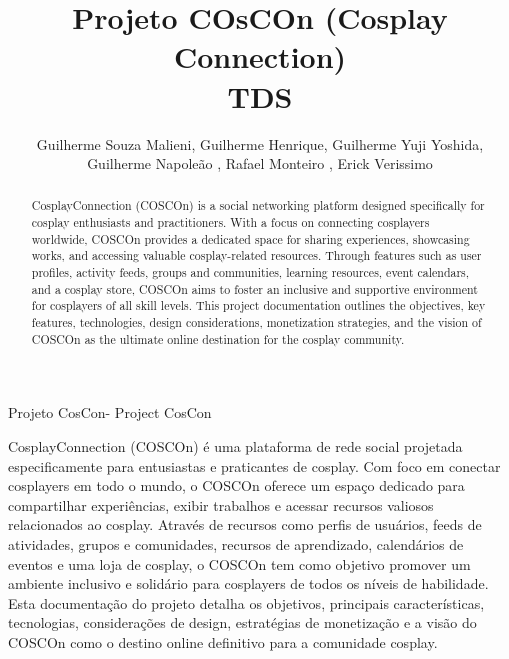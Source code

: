 \documentclass[12pt,a4paper,chapter=TITLE,section=TITLE,subsection=TITLE,subsubsection=TITLE]{article}
\title{Projeto COsCOn (Cosplay Connection)\\TDS}
\author{Guilherme Souza Malieni\inst{1}, Guilherme Henrique\inst{2}, Guilherme Yuji Yoshida\inst{3},\\ Guilherme Napoleão \inst{4} , Rafael Monteiro\inst{5} , Erick Verissimo\inst{6} }
\begin{document}
  



\frenchspacing 


%
%

\maketitle
Projeto CosCon-
Project CosCon

\begin{abstract}
  CosplayConnection (COSCOn) is a social networking platform designed specifically for cosplay enthusiasts and practitioners. With a focus on connecting cosplayers worldwide, COSCOn provides a dedicated space for sharing experiences, showcasing works, and accessing valuable cosplay-related resources. Through features such as user profiles, activity feeds, groups and communities, learning resources, event calendars, and a cosplay store, COSCOn aims to foster an inclusive and supportive environment for cosplayers of all skill levels. This project documentation outlines the objectives, key features, technologies, design considerations, monetization strategies, and the vision of COSCOn as the ultimate online destination for the cosplay community.
\end{abstract}
     
\begin{resumo1} 
  CosplayConnection (COSCOn) é uma plataforma de rede social projetada especificamente para entusiastas e praticantes de cosplay. Com foco em conectar cosplayers em todo o mundo, o COSCOn oferece um espaço dedicado para compartilhar experiências, exibir trabalhos e acessar recursos valiosos relacionados ao cosplay. Através de recursos como perfis de usuários, feeds de atividades, grupos e comunidades, recursos de aprendizado, calendários de eventos e uma loja de cosplay, o COSCOn tem como objetivo promover um ambiente inclusivo e solidário para cosplayers de todos os níveis de habilidade. Esta documentação do projeto detalha os objetivos, principais características, tecnologias, considerações de design, estratégias de monetização e a visão do COSCOn como o destino online definitivo para a comunidade cosplay.
\end{resumo1}
\end{document}
